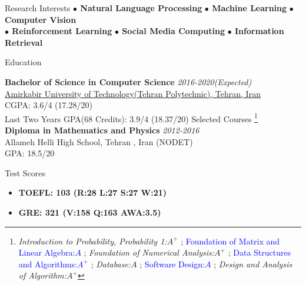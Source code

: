 \documentclass{resume} %
\begin{document}
	
	\begin{rSection}{Research Interests}
			\textbf{$\bullet$ Natural Language Processing} \hspace*{16pt}
			\textbf{ $\bullet$ Machine Learning}\hspace*{16pt}
			\textbf{ $\bullet$ Computer Vision}\hspace*{16pt}\\
			\textbf{ $\bullet$ Reinforcement Learning}\hspace*{16pt}
			\textbf{ $\bullet$ Social Media Computing}	\hspace*{16pt}	
			\textbf{ $\bullet$ Information Retrieval}\hspace*{16pt}


	\end{rSection}
	
	
	\begin{rSection}{Education}
		
		{\bf Bachelor of Science in Computer Science} \hfill {\em 2016-2020(Expected)} \\ 
		\href{https://www.topuniversities.com/universities/amirkabir-university-technology}{\textcolor{coolblack}{Amirkabir University of Technology(Tehran Polytechnic), Tehran, Iran} }\\
		CGPA: 3.6/4 (17.28/20)\\
		Last Two Years GPA(68 Credits): 3.9/4 (18.37/20) \hspace{20pt}		Selected Courses
		\footnote{\textit{Introduction to Probability, Probability 1:$A^{+}$ }; \textcolor{blue}{Foundation of Matrix and Linear Algebra:$A$ }; \textit{Foundation of Numerical Analysis:$A^{+}$ };  \textcolor{blue}{Data Structures and Algorithms:$A^{+}$ }; \textit{Database:$A$ }; \textcolor{blue}{Software Design:$A$} ; \textit{Design and Analysis of Algorithm:$A^{+}$}} \\
		{\bf Diploma in Mathematics and Physics} \hfill {\em 2012-2016}\\ 
		Allameh Helli High School, Tehran , Iran (NODET)\\
		GPA: 18.5/20
	\end{rSection}
	\begin{rSection}{Test Scores}
		\begin{itemize}{\bfseries}
			\item {\bfseries TOEFL: 103 (R:28 L:27 S:27 W:21)}
			\item {\bfseries GRE: 321 (V:158 Q:163 AWA:3.5)}
		\end{itemize}
		
	\end{rSection}
	
\end{document}
